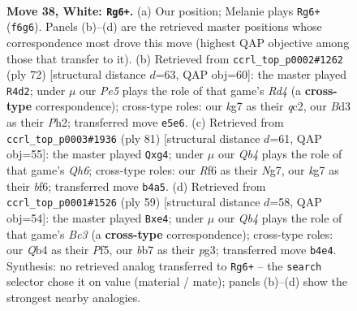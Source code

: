 \documentclass[11pt]{article}
\begin{document}
\clearpage

\begin{figure}[p]\centering
\begin{subfigure}{0.46\textwidth}\centering
\resizebox{\linewidth}{!}{%
\newchessgame
\chessboard[
  setfen={7r/1b1q2k1/5R2/r3P3/1Q5p/3B3P/1p4P1/6KR w - - 0 38},
  showmover=false,
  pgfstyle=straightmove, color=movearrow, markmove={f6-g6}
]}
\caption{}
\end{subfigure}\hfill
\begin{subfigure}{0.46\textwidth}\centering
\resizebox{\linewidth}{!}{%
\newchessgame
\chessboard[
  setfen={5r2/p3b1Q1/4k1p1/1p2n3/3R4/8/2q2PPP/3R2K1 w - - 0 37},
  showmover=false,
  pgfstyle=straightmove, color=movearrow, markmove={d4-d2}
]}
\caption{}
\end{subfigure}
\\[4pt]
\begin{subfigure}{0.46\textwidth}\centering
\resizebox{\linewidth}{!}{%
\newchessgame
\chessboard[
  setfen={4r1k1/5pn1/5Bp1/p3P3/P5R1/1N5q/3Q1K2/8 b - - 0 41},
  showmover=false,
  pgfstyle=straightmove, color=movearrow, markmove={h3-g4}
]}
\caption{}
\end{subfigure}\hfill
\begin{subfigure}{0.46\textwidth}\centering
\resizebox{\linewidth}{!}{%
\newchessgame
\chessboard[
  setfen={2kr4/8/2b5/2P2p2/2p1R2Q/3p2P1/P4qBK/1R6 b - - 1 30},
  showmover=false,
  pgfstyle=straightmove, color=movearrow, markmove={c6-e4}
]}
\caption{}
\end{subfigure}
\caption{\textbf{Move 38, White: \texttt{Rg6+}.} (a) Our position; Melanie plays \texttt{Rg6+} (\texttt{f6g6}). Panels (b)--(d) are the retrieved master positions whose correspondence most drove this move (highest QAP objective among those that transfer to it). (b) Retrieved from \texttt{ccrl\_top\_p0002\#1262} (ply 72) [structural distance $d$=63, QAP obj=60]: the master played \texttt{R4d2}; under $\mu$ our \emph{Pe5} plays the role of that game's \emph{Rd4} (a \textbf{cross-type} correspondence); cross-type roles: our \emph{k}g7 as their \emph{q}c2, our \emph{B}d3 as their \emph{P}h2; transferred move \texttt{e5e6}. (c) Retrieved from \texttt{ccrl\_top\_p0003\#1936} (ply 81) [structural distance $d$=61, QAP obj=55]: the master played \texttt{Qxg4}; under $\mu$ our \emph{Qb4} plays the role of that game's \emph{Qh6}; cross-type roles: our \emph{R}f6 as their \emph{N}g7, our \emph{k}g7 as their \emph{b}f6; transferred move \texttt{b4a5}. (d) Retrieved from \texttt{ccrl\_top\_p0001\#1526} (ply 59) [structural distance $d$=58, QAP obj=54]: the master played \texttt{Bxe4}; under $\mu$ our \emph{Qb4} plays the role of that game's \emph{Bc3} (a \textbf{cross-type} correspondence); cross-type roles: our \emph{Q}b4 as their \emph{P}f5, our \emph{b}b7 as their \emph{p}g3; transferred move \texttt{b4e4}. Synthesis: no retrieved analog transferred to \texttt{Rg6+} -- the \texttt{search} selector chose it on value (material / mate); panels (b)--(d) show the strongest nearby analogies.}
\label{fig:thought-m74}
\end{figure}
\end{document}
